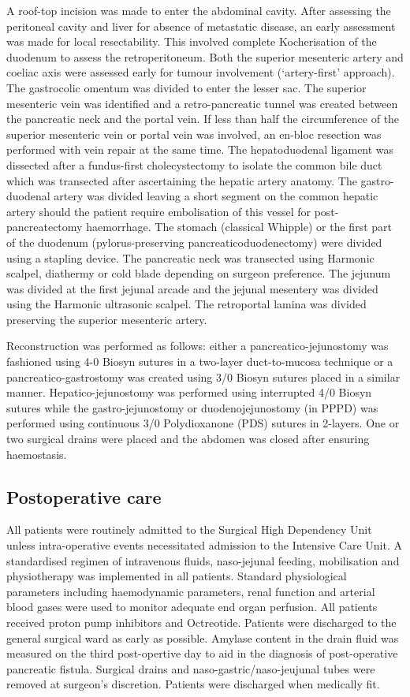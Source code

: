A roof-top incision was made to enter the abdominal cavity. 
After assessing the peritoneal cavity and liver for absence of metastatic disease, an early assessment was made for local resectability. 
This involved complete Kocherisation of the duodenum to assess the retroperitoneum. 
Both the superior mesenteric artery and coeliac axis were assessed early for tumour involvement (‘artery-first’ approach). 
The gastrocolic omentum was divided to enter the lesser sac. 
The superior mesenteric vein was identified and a retro-pancreatic tunnel was created between the pancreatic neck and the portal vein. 
If less than half the circumference of the superior mesenteric vein or portal vein was involved, an en-bloc resection was performed with vein repair at the same time. 
The hepatoduodenal ligament was dissected after a fundus-first cholecystectomy to isolate the common bile duct which was transected after ascertaining the hepatic artery anatomy. 
The gastro-duodenal artery was divided leaving a short segment on the common hepatic artery should the patient require embolisation of this vessel for post-pancreatectomy haemorrhage. 
The stomach (classical Whipple) or the first part of the duodenum (pylorus-preserving pancreaticoduodenectomy) were divided using a stapling device. 
The pancreatic neck was transected using Harmonic scalpel, diathermy or cold blade depending on surgeon preference. 
The jejunum was divided at the first jejunal arcade and the jejunal mesentery was divided using the Harmonic ultrasonic scalpel. 
The retroportal lamina was divided preserving the superior mesenteric artery. 

Reconstruction was performed as follows: either a pancreatico-jejunostomy was fashioned using 4-0 Biosyn sutures in a two-layer duct-to-mucosa technique or a pancreatico-gastrostomy was created using 3/0 Biosyn sutures placed in a similar manner. 
Hepatico-jejunostomy was performed using interrupted 4/0 Biosyn sutures while the gastro-jejunostomy or duodenojejunostomy (in PPPD) was performed using continuous 3/0 Polydioxanone (PDS) sutures in 2-layers. 
One or two surgical drains were placed and the abdomen was closed after ensuring haemostasis.

\subsection{Postoperative care}
All patients were routinely admitted to the Surgical High Dependency Unit unless intra-operative events necessitated admission to the Intensive Care Unit. 
A standardised regimen of intravenous fluids, naso-jejunal feeding, mobilisation and physiotherapy was implemented in all patients. 
Standard physiological parameters including haemodynamic parameters, renal function and arterial blood gases were used to monitor adequate end organ perfusion. 
All patients received proton pump inhibitors and Octreotide. 
Patients were discharged to the general surgical ward as early as possible. 
Amylase content in the drain fluid was measured on the third post-opertive day to aid in the diagnosis of post-operative pancreatic fistula. 
Surgical drains and naso-gastric/naso-jeujunal tubes were removed at surgeon's discretion. 
Patients were discharged when medically fit.

